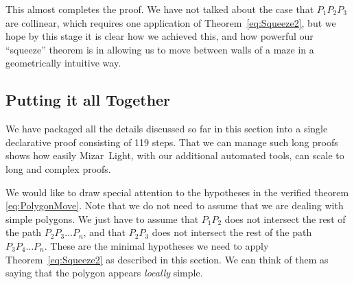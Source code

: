 This almost completes the proof. We have not talked about the case that $P_1P_2P_3$ are collinear, which requires one application of Theorem~\ref{eq:Squeeze2}, but we hope by this stage it is clear how we achieved this, and how powerful our ``squeeze'' theorem is in allowing us to move between walls of a maze in a geometrically intuitive way.

\subsection{Putting it all Together}
We have packaged all the details discussed so far in this section into a single declarative proof consisting of 119 steps. That we can manage such long proofs shows how easily Mizar~Light, with our additional automated tools, can scale to long and complex proofs. 

We would like to draw special attention to the hypotheses in the verified theorem \eqref{eq:PolygonMove}. Note that we do not need to assume that we are dealing with simple polygons. We just have to assume that $P_1P_2$ does not intersect the rest of the path $P_2P_3\ldots P_n$, and that $P_2P_3$ does not intersect the rest of the path $P_3P_4\ldots P_n$. These are the minimal hypotheses we need to apply Theorem~\ref{eq:Squeeze2} as described in this section. We can think of them as saying that the polygon appears \emph{locally} simple.

